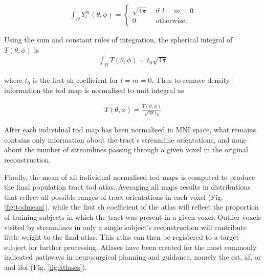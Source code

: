 \begin{align}
  \int_{\Omega} Y^m_l(\theta, \phi) = \begin{cases}
   \sqrt{4\pi} & \text{ if } l=m=0\\
   0 & \text{ otherwise. }
  \end{cases}
\end{align}

Using the sum and constant rules of integration, the spherical integral of $T(\theta,\phi)$ is
\begin{align}
  \int_{\Omega} T(\theta,\phi) = t_0 \sqrt{4\pi}
\end{align}

where $t_0$ is the first \gls{sh} coefficient for $l=m=0$. Thus to remove density information the \gls{tod} map is normalised to unit integral as

\begin{align}
  \widetilde{T}(\theta, \phi) = \frac{T(\theta,\phi)}{\sqrt{4\pi} t_0}
\end{align}

After each individual \gls{tod} map has been normalised in MNI space, what remains contains only information about the tract's streamline orientations, and none about the number of streamlines passing through a given voxel in the original reconstruction.

\begin{SCfigure}
  
  \caption{Averaging the \gls{tod} contributions produces from all subjects (smaller cutouts) produces a smooth map of voxel-wise orientation distributions (large cutout), illustrated here in the anterior point of Meyer's loop, a part of the \gls{or} with significant inter-subject variation. Adapted from \textcite{Young2024}}
  \label{fig:todmean}
\end{SCfigure}

Finally, the mean of all individual normalised \gls{tod} maps is computed to produce the final population tract \gls{tod} atlas.
Averaging all maps results in distributions that reflect all possible ranges of tract orientations in each voxel (Fig. \ref{fig:todmean}), while the first \gls{sh} coefficient of the atlas will reflect the proportion of training subjects in which the tract was present in a given voxel.
Outlier voxels visited by streamlines in only a single subject's reconstruction will contribute little weight to the final atlas.
This atlas can then be registered to a target subject for further processing.
Atlases have been created for the most commonly indicated pathways in neurosurgical planning and guidance, namely the \gls{cst}, \gls{af}, \gls{or} and \gls{ifof} (Fig. \ref{fig:atlases}).

